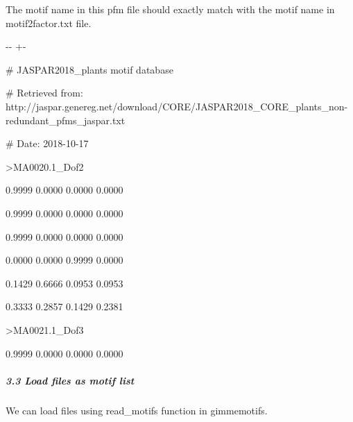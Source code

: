 \documentclass[letterpaper,10pt,english]{sphinxmanual}
\newlength\nbsphinxcodecellspacing
\begin{document}
The motif name in this pfm file should exactly match with the motif name in motif2factor.txt file.

{
\begin{sphinxVerbatim}[commandchars=\\\{\}]
\llap{\color{nbsphinxin}[55]:\,\hspace{\fboxrule}\hspace{\fboxsep}}    
        
         
\end{sphinxVerbatim}
}

{

\kern-\sphinxverbatimsmallskipamount\kern-\baselineskip
\kern+\FrameHeightAdjust\kern-\fboxrule
\vspace{\nbsphinxcodecellspacing}

\begin{sphinxVerbatim}[commandchars=\\\{\}]
\# JASPAR2018\_plants motif database

\# Retrieved from: http://jaspar.genereg.net/download/CORE/JASPAR2018\_CORE\_plants\_non-redundant\_pfms\_jaspar.txt

\# Date: 2018-10-17

>MA0020.1\_Dof2

0.9999  0.0000  0.0000  0.0000

0.9999  0.0000  0.0000  0.0000

0.9999  0.0000  0.0000  0.0000

0.0000  0.0000  0.9999  0.0000

0.1429  0.6666  0.0953  0.0953

0.3333  0.2857  0.1429  0.2381

>MA0021.1\_Dof3

0.9999  0.0000  0.0000  0.0000

\end{sphinxVerbatim}
}


\subparagraph{3.3 Load files as motif list}
\label{\detokenize{notebooks/02_motif_scan/motif_data_preparation/01_How_to_load_motif_data:3.3-Load-files-as-motif-list}}
We can load files using read\_motifs function in gimmemotifs.
\end{document}
